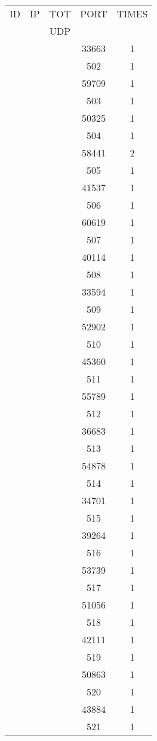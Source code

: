 \documentclass[a4paper]{scrartcl}
\begin{document}
\begin{minipage}[b]{0.5\linewidth}
\begin{tabular}{| c | c | c | c | c |}
\hline
ID & IP & TOT & PORT & TIMES \\ 
   &    & UDP &      &       \\ 
\hline
& & & 33663 & 1 \\ & & & 502 & 1 \\ & & & 59709 & 1 \\ & & & 503 & 1 \\ & & & 50325 & 1 \\ & & & 504 & 1 \\ & & & 58441 & 2 \\ & & & 505 & 1 \\ & & & 41537 & 1 \\ & & & 506 & 1 \\ & & & 60619 & 1 \\ & & & 507 & 1 \\ & & & 40114 & 1 \\ & & & 508 & 1 \\ & & & 33594 & 1 \\ & & & 509 & 1 \\ & & & 52902 & 1 \\ & & & 510 & 1 \\ & & & 45360 & 1 \\ & & & 511 & 1 \\ & & & 55789 & 1 \\ & & & 512 & 1 \\ & & & 36683 & 1 \\ & & & 513 & 1 \\ & & & 54878 & 1 \\ & & & 514 & 1 \\ & & & 34701 & 1 \\ & & & 515 & 1 \\ & & & 39264 & 1 \\ & & & 516 & 1 \\ & & & 53739 & 1 \\ & & & 517 & 1 \\ & & & 51056 & 1 \\ & & & 518 & 1 \\ & & & 42111 & 1 \\ & & & 519 & 1 \\ & & & 50863 & 1 \\ & & & 520 & 1 \\ & & & 43884 & 1 \\ & & & 521 & 1 \\ \hline\end{tabular}\end{minipage} \hfill\begin{minipage}[b]{0.5\linewidth}\begin{tabular}{| c | c | c | c | c |}

\end{tabular}
\end{minipage}
\end{document}
